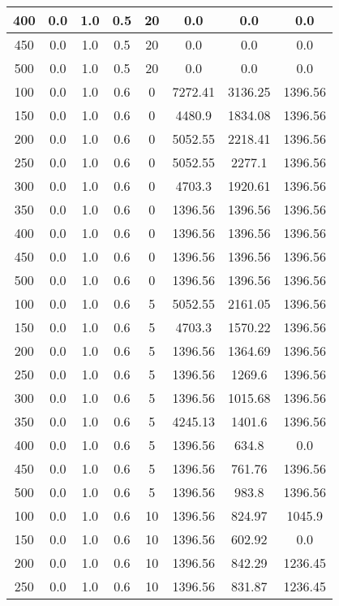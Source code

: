 \documentclass[a4paper, 12pt]{extreport}
\begin{document}
\begin{itemize}
\begin{longtable}{|c|c|c|c|c|c|c|c|}
			400 & 0.0 & 1.0 & 0.5 & 20 & 0.0 & 0.0 & 0.0 \\\hline
			450 & 0.0 & 1.0 & 0.5 & 20 & 0.0 & 0.0 & 0.0 \\\hline
			500 & 0.0 & 1.0 & 0.5 & 20 & 0.0 & 0.0 & 0.0 \\\hline
			100 & 0.0 & 1.0 & 0.6 & 0 & 7272.41 & 3136.25 & 1396.56 \\\hline
			150 & 0.0 & 1.0 & 0.6 & 0 & 4480.9 & 1834.08 & 1396.56 \\\hline
			200 & 0.0 & 1.0 & 0.6 & 0 & 5052.55 & 2218.41 & 1396.56 \\\hline
			250 & 0.0 & 1.0 & 0.6 & 0 & 5052.55 & 2277.1 & 1396.56 \\\hline
			300 & 0.0 & 1.0 & 0.6 & 0 & 4703.3 & 1920.61 & 1396.56 \\\hline
			350 & 0.0 & 1.0 & 0.6 & 0 & 1396.56 & 1396.56 & 1396.56 \\\hline
			400 & 0.0 & 1.0 & 0.6 & 0 & 1396.56 & 1396.56 & 1396.56 \\\hline
			450 & 0.0 & 1.0 & 0.6 & 0 & 1396.56 & 1396.56 & 1396.56 \\\hline
			500 & 0.0 & 1.0 & 0.6 & 0 & 1396.56 & 1396.56 & 1396.56 \\\hline
			100 & 0.0 & 1.0 & 0.6 & 5 & 5052.55 & 2161.05 & 1396.56 \\\hline
			150 & 0.0 & 1.0 & 0.6 & 5 & 4703.3 & 1570.22 & 1396.56 \\\hline
			200 & 0.0 & 1.0 & 0.6 & 5 & 1396.56 & 1364.69 & 1396.56 \\\hline
			250 & 0.0 & 1.0 & 0.6 & 5 & 1396.56 & 1269.6 & 1396.56 \\\hline
			300 & 0.0 & 1.0 & 0.6 & 5 & 1396.56 & 1015.68 & 1396.56 \\\hline
			350 & 0.0 & 1.0 & 0.6 & 5 & 4245.13 & 1401.6 & 1396.56 \\\hline
			400 & 0.0 & 1.0 & 0.6 & 5 & 1396.56 & 634.8 & 0.0 \\\hline
			450 & 0.0 & 1.0 & 0.6 & 5 & 1396.56 & 761.76 & 1396.56 \\\hline
			500 & 0.0 & 1.0 & 0.6 & 5 & 1396.56 & 983.8 & 1396.56 \\\hline
			100 & 0.0 & 1.0 & 0.6 & 10 & 1396.56 & 824.97 & 1045.9 \\\hline
			150 & 0.0 & 1.0 & 0.6 & 10 & 1396.56 & 602.92 & 0.0 \\\hline
			200 & 0.0 & 1.0 & 0.6 & 10 & 1396.56 & 842.29 & 1236.45 \\\hline
			250 & 0.0 & 1.0 & 0.6 & 10 & 1396.56 & 831.87 & 1236.45 \\\hline

\end{longtable}
\end{itemize}
\end{document}
